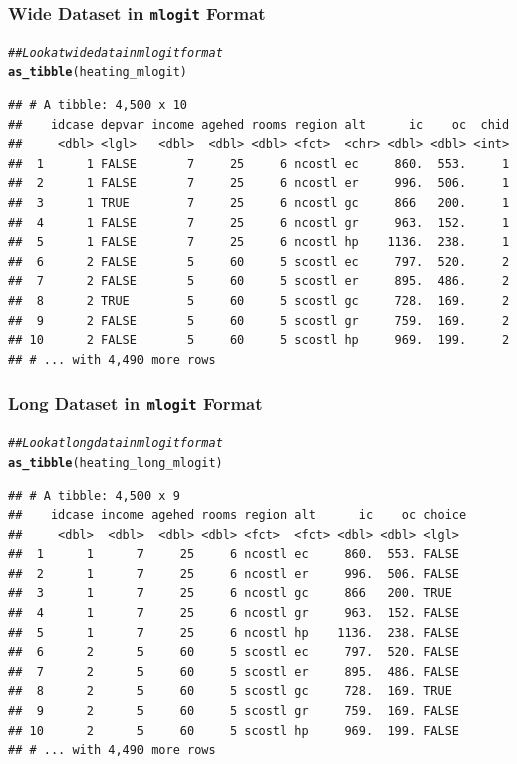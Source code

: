 \documentclass{beamer}\usepackage[]{graphicx}\usepackage[]{color}
\makeatletter
\newcommand{\hlcom}[1]{\textcolor[rgb]{0.678,0.584,0.686}{\textit{#1}}}%
\newcommand{\hlstd}[1]{\textcolor[rgb]{0.345,0.345,0.345}{#1}}%
\newcommand{\hlkwd}[1]{\textcolor[rgb]{0.737,0.353,0.396}{\textbf{#1}}}%
\newenvironment{kframe}{%
 \def\at@end@of@kframe{}%
 \ifinner\ifhmode%
  \def\at@end@of@kframe{\end{minipage}}%
  \begin{minipage}{\columnwidth}%
 \fi\fi%
 \def\FrameCommand##1{\hskip\@totalleftmargin \hskip-\fboxsep
 \colorbox{shadecolor}{##1}\hskip-\fboxsep
     \hskip-\linewidth \hskip-\@totalleftmargin \hskip\columnwidth}%
 \MakeFramed {\advance\hsize-\width
   \@totalleftmargin\z@ \linewidth\hsize
   \@setminipage}}%
 {\par\unskip\endMakeFramed%
 \at@end@of@kframe}
\newenvironment{knitrout}{}{} %
\makeatother
\begin{document}
\begin{frame}[fragile]\frametitle{Wide Dataset in \texttt{mlogit} Format}
\begin{knitrout}\footnotesize
{}\color{fgcolor}\begin{kframe}
\begin{alltt}
\hlcom{## Look at wide data in mlogit format}
\hlkwd{as_tibble}\hlstd{(heating_mlogit)}
\end{alltt}
\begin{verbatim}
## # A tibble: 4,500 x 10
##    idcase depvar income agehed rooms region alt      ic    oc  chid
##     <dbl> <lgl>   <dbl>  <dbl> <dbl> <fct>  <chr> <dbl> <dbl> <int>
##  1      1 FALSE       7     25     6 ncostl ec     860.  553.     1
##  2      1 FALSE       7     25     6 ncostl er     996.  506.     1
##  3      1 TRUE        7     25     6 ncostl gc     866   200.     1
##  4      1 FALSE       7     25     6 ncostl gr     963.  152.     1
##  5      1 FALSE       7     25     6 ncostl hp    1136.  238.     1
##  6      2 FALSE       5     60     5 scostl ec     797.  520.     2
##  7      2 FALSE       5     60     5 scostl er     895.  486.     2
##  8      2 TRUE        5     60     5 scostl gc     728.  169.     2
##  9      2 FALSE       5     60     5 scostl gr     759.  169.     2
## 10      2 FALSE       5     60     5 scostl hp     969.  199.     2
## # ... with 4,490 more rows
\end{verbatim}
\end{kframe}
\end{knitrout}
\end{frame}

\begin{frame}[fragile]\frametitle{Long Dataset in \texttt{mlogit} Format}
\begin{knitrout}\footnotesize
{}\color{fgcolor}\begin{kframe}
\begin{alltt}
\hlcom{## Look at long data in mlogit format}
\hlkwd{as_tibble}\hlstd{(heating_long_mlogit)}
\end{alltt}
\begin{verbatim}
## # A tibble: 4,500 x 9
##    idcase income agehed rooms region alt      ic    oc choice
##     <dbl>  <dbl>  <dbl> <dbl> <fct>  <fct> <dbl> <dbl> <lgl> 
##  1      1      7     25     6 ncostl ec     860.  553. FALSE 
##  2      1      7     25     6 ncostl er     996.  506. FALSE 
##  3      1      7     25     6 ncostl gc     866   200. TRUE  
##  4      1      7     25     6 ncostl gr     963.  152. FALSE 
##  5      1      7     25     6 ncostl hp    1136.  238. FALSE 
##  6      2      5     60     5 scostl ec     797.  520. FALSE 
##  7      2      5     60     5 scostl er     895.  486. FALSE 
##  8      2      5     60     5 scostl gc     728.  169. TRUE  
##  9      2      5     60     5 scostl gr     759.  169. FALSE 
## 10      2      5     60     5 scostl hp     969.  199. FALSE 
## # ... with 4,490 more rows
\end{verbatim}
\end{kframe}
\end{knitrout}
\end{frame}
\end{document}
